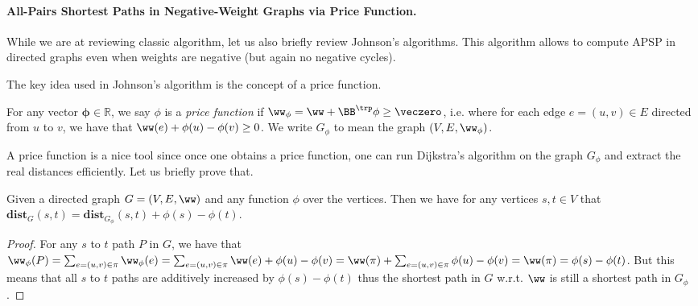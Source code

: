 

\paragraph{All-Pairs Shortest Paths in Negative-Weight Graphs via Price Function.} While we are at reviewing classic algorithm, let us also briefly review Johnson's algorithms. This algorithm allows to compute APSP in directed graphs even when weights are negative (but again no negative cycles).

The key idea used in Johnson's algorithm is the concept of a price function.

\begin{definition}
For any vector $\mathbf{\phi} \in \mathbb{R}$, we say $\phi$ is a \emph{price function} if $\ww_{\mathbf{\phi}} = \ww + \BB^{\trp} \mathbf{\phi} \geq \veczero$, i.e. where for each edge $e = (u,v) \in E$ directed from $u$ to $v$, we have that $\ww(e) + \phi(u) - \phi(v) \geq 0$. We write $G_{\phi}$ to mean the graph $(V, E, \ww_{\phi})$. %
\end{definition}

A price function is a nice tool since once one obtains a price function, one can run Dijkstra's algorithm on the graph $G_{\phi}$ and extract the real distances efficiently. Let us briefly prove that.

\begin{claim}
Given a directed graph $G = (V,E, \ww)$ and any function $\phi$ over the vertices. Then we have for any vertices $s,t \in V$ that $\mathbf{dist}_{G}(s,t) = \mathbf{dist}_{G_{\phi}}(s, t) + \phi(s) - \phi(t)$.  
\end{claim}
\begin{proof}
For any $s$ to $t$ path $P$ in $G$, we have that $\ww_{\phi}(P) = \sum_{e = (u,v) \in \pi} \ww_{\phi}(e) =  \sum_{e = (u,v) \in \pi}  \ww(e) + \phi(u) - \phi(v) = \ww(\pi) + \sum_{e = (u,v) \in \pi}  \phi(u) - \phi(v) = \ww(\pi) = \phi(s) - \phi(t)$. But this means that all $s$ to $t$ paths are additively increased by $\phi(s) - \phi(t)$ thus the shortest path in $G$ w.r.t. $\ww$ is still a shortest path in $G_{\phi}$. 
\end{proof}

